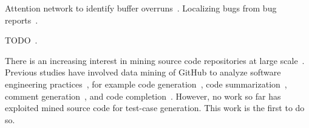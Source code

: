 Attention network to identify buffer overruns~\cite{Choi2016}. Localizing bugs from bug reports~\cite{Lam2016,Huo2016}.

TODO~\cite{White2016}.

There is an increasing interest in mining source code repositories at large scale~\cite{Allamanis2013a,White2015a,Bird2009}. Previous studies have involved data mining of GitHub to analyze software engineering practices~\cite{Wu2014,Guzman2014,Baishakhi2014a,Vasilescu2015}, for example code generation~\cite{Zhang2015a}, code summarization~\cite{Allamanis2016}, comment generation~\cite{Wong2013}, and code completion~\cite{Raychev2014}. However, no work so far has exploited mined source code for test-case generation. This work is the first to do so.
